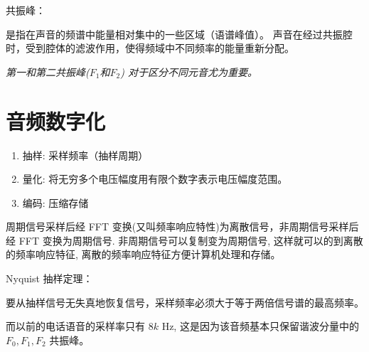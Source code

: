 共振峰：

是指在声音的频谱中能量相对集中的一些区域（语谱峰值）。
声音在经过共振腔时，受到腔体的滤波作用，使得频域中不同频率的能量重新分配。

\emph{第一和第二共振峰($F_1$和$F_2$) 对于区分不同元音尤为重要。}

\section{音频数字化}

\begin{enumerate}
	\item 抽样: 采样频率（抽样周期）
	\item 量化: 将无穷多个电压幅度用有限个数字表示电压幅度范围。
	\item 编码: 压缩存储
\end{enumerate}

周期信号采样后经 FFT 变换(又叫频率响应特性)为离散信号，非周期信号采样后经 FFT 变换为周期信号.
非周期信号可以复制变为周期信号, 这样就可以的到离散的频率响应特征, 离散的频率响应特征方便计算机处理和存储。

Nyquist 抽样定理：

要从抽样信号无失真地恢复信号，采样频率必须大于等于两倍信号谱的最高频率。

而以前的电话语音的采样率只有 $8k$ Hz, 这是因为该音频基本只保留谐波分量中的 $F_0, F_1, F_2$ 共振峰。
